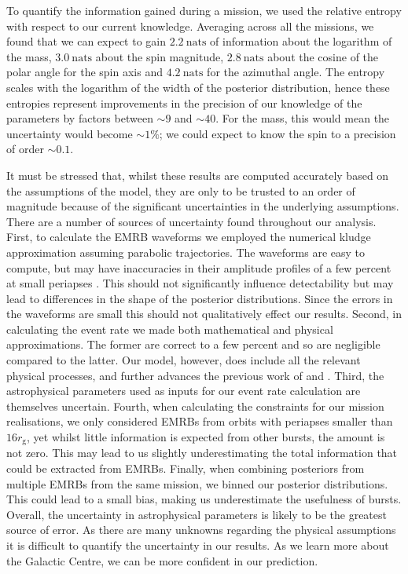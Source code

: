 \documentclass[useAMS,usedcolumn,usegraphicx,usenatbib]{mn2e}
\newcommand{\units}[1]{\ensuremath{~\mathrm{#1}}}
\newcommand{\sub}[1]{\ensuremath{_\mathrm{#1}}}
\begin{document}
To quantify the information gained during a mission, we used the relative entropy with respect to our current knowledge. Averaging across all the missions, we found that we can expect to gain $2.2\units{nats}$ of information about the logarithm of the mass, $3.0\units{nats}$ about the spin magnitude, $2.8\units{nats}$ about the cosine of the polar angle for the spin axis and $4.2\units{nats}$ for the azimuthal angle. The entropy scales with the logarithm of the width of the posterior distribution, hence these entropies represent improvements in the precision of our knowledge of the parameters by factors between $\sim9$ and $\sim40$. For the mass, this would mean the uncertainty would become $\sim1\%$; we could expect to know the spin to a precision of order $\sim0.1$.

It must be stressed that, whilst these results are computed accurately based on the assumptions of the model, they are only to be trusted to an order of magnitude because of the significant uncertainties in the underlying assumptions. There are a number of sources of uncertainty found throughout our analysis. First, to calculate the EMRB waveforms we employed the numerical kludge approximation assuming parabolic trajectories. The waveforms are easy to compute, but may have inaccuracies in their amplitude profiles of a few percent at small periapses \citep{Berry2013}. This should not significantly influence detectability but may lead to differences in the shape of the posterior distributions. Since the errors in the waveforms are small this should not qualitatively effect our results. Second, in calculating the event rate we made both mathematical and physical approximations. The former are correct to a few percent and so are negligible compared to the latter. Our model, however, does include all the relevant physical processes, and further advances the previous work of \citet{Rubbo2006} and \citet{Hopman2007}. Third, the astrophysical parameters used as inputs for our event rate calculation are themselves uncertain. Fourth, when calculating the constraints for our mission realisations, we only considered EMRBs from orbits with periapses smaller than $16 r\sub{g}$, yet whilst little information is expected from other bursts, the amount is not zero. This may lead to us slightly underestimating the total information that could be extracted from EMRBs. Finally, when combining posteriors from multiple EMRBs from the same mission, we binned our posterior distributions. This could lead to a small bias, making us underestimate the usefulness of bursts. Overall, the uncertainty in astrophysical parameters is likely to be the greatest source of error. As there are many unknowns regarding the physical assumptions it is difficult to quantify the uncertainty in our results. As we learn more about the Galactic Centre, we can be more confident in our prediction.
\end{document}
